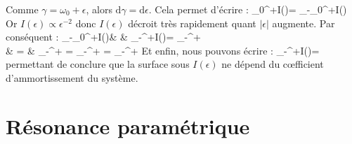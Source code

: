 Comme $\gamma = \omega_{0} + \epsilon$, alors $\mathrm{d}\gamma = \mathrm{d}\epsilon$. Cela permet d'\'{e}crire :
\benn
	\int_{0}^{+\infty}I(\gamma)\gamma = \int_{-\omega_{0}}^{+\infty}I(\epsilon)\epsilon
\eenn
Or $I(\epsilon) \propto \epsilon^{-2}$ donc $I(\epsilon)$ d\'{e}croit tr\`{e}s rapidement quant $\lvert\epsilon\rvert$ augmente. Par cons\'{e}quent :
\bea
	\int_{-\omega_{0}}^{+\infty}I(\epsilon)\epsilon & \approx & \int_{-\infty}^{+\infty}I(\epsilon)\epsilon = \int_{-\infty}^{+\infty} \nonumber \\
	& = & \int_{-\infty}^{+\infty} = \int_{-\infty}^{+\infty} = \left[\arctan\right]_{-\infty}^{+\infty} \nonumber
\eea
Et enfin, nous pouvons \'{e}crire :
\be
	\int_{-\infty}^{+\infty}I(\epsilon)\epsilon =  \label{EQ:26_10}
\ee
permettant de conclure que la surface sous $I(\epsilon)$ ne d\'{e}pend du c{\oe}fficient d'ammortissement du syst\`{e}me.

\section{R\'{e}sonance param\'{e}trique}